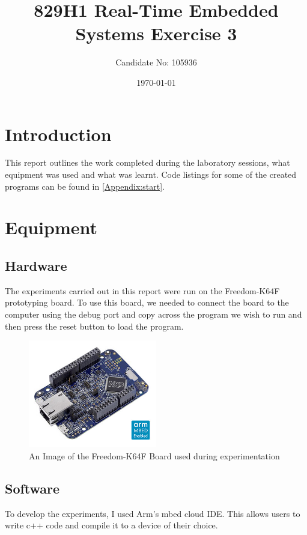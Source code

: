 \documentclass[a4paper,12pt]{scrartcl}
\title{829H1 Real-Time Embedded Systems Exercise 3}
\author{Candidate No: 105936}
\date{\today}
\begin{document}
	
	\begin{titlepage}
		\maketitle
	\end{titlepage}
	
	\tableofcontents
	\newpage
	
	\section{Introduction}
	{
		This report outlines the work completed during the laboratory sessions, what equipment was used and what was learnt. Code listings for some of the created programs can be found in \cref{Appendix:start}.
	}

	\section{Equipment}
	{
		\subsection{Hardware}{
			The experiments carried out in this report were run on the Freedom-K64F prototyping board\cite{nxpproducts2014}. To use this board, we needed to connect the board to the computer using the debug port and copy across the program we wish to run and then press the reset button to load the program.
			\begin{figure}[h]
				\centering
				\includegraphics[width=0.5\textwidth]{FRDM-K64F-ANGLE}
				\caption{An Image of the Freedom-K64F Board used during experimentation\cite{nxpproducts2014}}
				\label{img:FRDM-K64F}
			\end{figure}
		}
		\subsection{Software}
		{
			To develop the experiments, I used Arm's mbed cloud IDE. This allows users to write c++ code and compile it to a device of their choice. 
		}
	}
	
\end{document}
